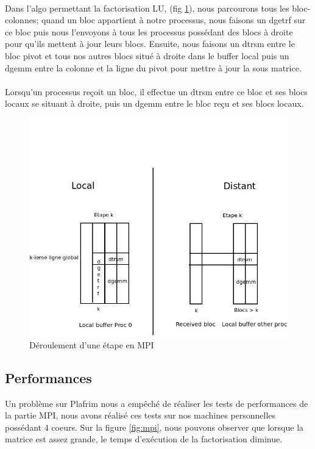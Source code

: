 \documentclass{article}
\begin{document}
\paragraph{}
Dans l'algo permettant la factorisation LU, (fig \ref{diag:mpi}), nous parcourons tous les bloc-colonnes; quand un bloc appartient à notre processus, nous faisons un dgetrf sur ce bloc puis nous l'envoyons à tous les processus possédant des blocs à droite pour qu'ils mettent à jour leurs blocs. 
Ensuite, nous faisons un dtrsm entre le bloc pivot et tous nos autres blocs situé à droite dans le buffer local puis un dgemm entre la colonne et la ligne du pivot pour mettre à jour la sous matrice. 
\paragraph{}Lorsqu'un processus reçoit un bloc, il effectue un dtrsm entre ce bloc et ses blocs locaux se situant à droite, puis un dgemm entre le bloc reçu et ses blocs locaux.


\begin{figure}[ht]
  \centering
  \includegraphics[scale=0.5]{pictures/Diagramme_mpi.jpeg}
  \caption{\label{diag:mpi} Déroulement d'une étape en MPI}
\end{figure}

\subsection{Performances}
Un problème sur Plafrim nous a empêché de réaliser les tests de performances de la partie MPI, nous avons réalisé ces tests sur nos machines personnelles possédant 4 coeurs. Sur la figure \ref{fig:mpi}, nous pouvons observer que lorsque la matrice est assez grande, le temps d'exécution de la factorisation diminue.
\end{document}
